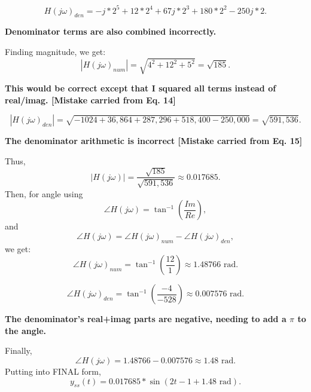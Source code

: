 \documentclass[12pt]{article}
\begin{document}
\begin{equation}
H(j\omega)_{den} = -j*2^5 +12*2^4 + 67j*2^3 +180*2^2 -250j*2.
\end{equation}
\begin{flushright}\color{red}\scriptsize \textbf{Denominator terms are also combined incorrectly.}\end{flushright}
Finding magnitude, we get:
\begin{equation}
|H(j\omega)_{num}| = \sqrt{4^2+12^2+5^2}=\sqrt{185}.
\end{equation}
\begin{flushright}\color{red}\scriptsize \textbf{This would be correct except that I squared all terms instead of real/imag. [Mistake carried from Eq. 14]}\end{flushright}

\begin{equation}
|H(j\omega)_{den}| = \sqrt{-1024 + 36,864 + 287,296 + 518,400 - 250,000}=\sqrt{591,536}.
\end{equation}
\begin{flushright}\color{red}\scriptsize \textbf{The denominator arithmetic is incorrect [Mistake carried from Eq. 15]}\end{flushright}
Thus, 
\begin{equation}
|H(j\omega)| = \frac{\sqrt{185}}{\sqrt{591,536}} \approx 0.017685.
\end{equation}
Then, for angle using
\begin{equation}
\angle H(j\omega) = \tan^{-1}\left(\frac{Im}{Re}\right),
\end{equation}
and
\begin{equation}
\angle H(j\omega) = \angle H(j\omega)_{num} - \angle H(j\omega)_{den},
\end{equation}
we get:
\begin{equation}
\angle H(j\omega)_{num} = \tan^{-1}\left(\frac{12}{1}\right) \approx 1.48766 \text{ rad}.
\end{equation}


\begin{equation}
\angle H(j\omega)_{den} = \tan^{-1}\left(\frac{-4}{-528}\right) \approx 0.007576 \text{ rad}.
\end{equation}
\begin{flushright}\color{red}\scriptsize \textbf{The denominator's real+imag parts are negative, needing to add a $\pi$ to the angle.}\end{flushright}
Finally, 
\begin{equation}
\angle H(j\omega) = 1.48766 - 0.007576 \approx 1.48 \text{ rad}.
\end{equation}
Putting into FINAL form, 
\begin{equation}
y_{ss}(t) = 0.017685*\sin(2t-1+1.48 \text{ rad}).
\end{equation}
\end{document}
